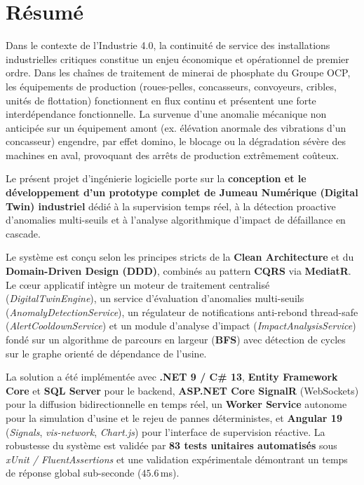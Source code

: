 ﻿\chapter*{Résumé}

Dans le contexte de l'Industrie 4.0, la continuité de service des installations industrielles critiques constitue un enjeu économique et opérationnel de premier ordre. Dans les chaînes de traitement de minerai de phosphate du Groupe OCP, les équipements de production (roues-pelles, concasseurs, convoyeurs, cribles, unités de flottation) fonctionnent en flux continu et présentent une forte interdépendance fonctionnelle. La survenue d'une anomalie mécanique non anticipée sur un équipement amont (ex. élévation anormale des vibrations d'un concasseur) engendre, par effet domino, le blocage ou la dégradation sévère des machines en aval, provoquant des arrêts de production extrêmement coûteux.

Le présent projet d'ingénierie logicielle porte sur la \textbf{conception et le développement d'un prototype complet de Jumeau Numérique (Digital Twin) industriel} dédié à la supervision temps réel, à la détection proactive d'anomalies multi-seuils et à l'analyse algorithmique d'impact de défaillance en cascade.

Le système est conçu selon les principes stricts de la \textbf{Clean Architecture} et du \textbf{Domain-Driven Design (DDD)}, combinés au pattern \textbf{CQRS} via \textbf{MediatR}. Le cœur applicatif intègre un moteur de traitement centralisé (\textit{DigitalTwinEngine}), un service d'évaluation d'anomalies multi-seuils (\textit{AnomalyDetectionService}), un régulateur de notifications anti-rebond thread-safe (\textit{AlertCooldownService}) et un module d'analyse d'impact (\textit{ImpactAnalysisService}) fondé sur un algorithme de parcours en largeur (\textbf{BFS}) avec détection de cycles sur le graphe orienté de dépendance de l'usine.

La solution a été implémentée avec \textbf{.NET 9 / C\# 13}, \textbf{Entity Framework Core} et \textbf{SQL Server} pour le backend, \textbf{ASP.NET Core SignalR} (WebSockets) pour la diffusion bidirectionnelle en temps réel, un \textbf{Worker Service} autonome pour la simulation d'usine et le rejeu de pannes déterministes, et \textbf{Angular 19} (\textit{Signals}, \textit{vis-network}, \textit{Chart.js}) pour l'interface de supervision réactive. La robustesse du système est validée par \textbf{83 tests unitaires automatisés} sous \textit{xUnit / FluentAssertions} et une validation expérimentale démontrant un temps de réponse global sub-seconde ($45.6$\,ms).

